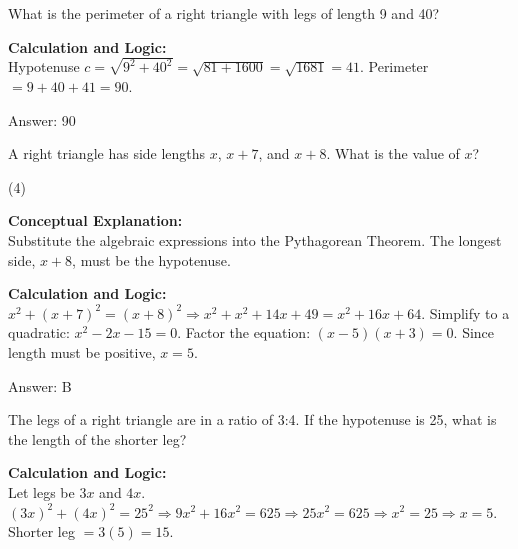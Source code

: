 \documentclass[11pt,paper=a4,answers]{exam}
\begin{document}
\begin{questions}
\vspace{60pt}

\question
What is the perimeter of a right triangle with legs of length 9 and 40?

\begin{solution}
\textbf{Calculation and Logic:} \\
Hypotenuse $c = \sqrt{9^2 + 40^2} = \sqrt{81 + 1600} = \sqrt{1681} = 41$. Perimeter $= 9 + 40 + 41 = 90$.

\vspace{30pt}

Answer: \colorbox{yellow!100}{90}
\end{solution}

\vspace{60pt}

\question
A right triangle has side lengths $x$, $x+7$, and $x+8$. What is the value of $x$?
\begin{tasks}(4)
\end{tasks}

\begin{solution}
\textbf{Conceptual Explanation:} \\
Substitute the algebraic expressions into the Pythagorean Theorem. The longest side, $x+8$, must be the hypotenuse.

\vspace{30pt}

\textbf{Calculation and Logic:} \\
$x^2 + (x+7)^2 = (x+8)^2 \Rightarrow x^2 + x^2 + 14x + 49 = x^2 + 16x + 64$. Simplify to a quadratic: $x^2 - 2x - 15 = 0$. Factor the equation: $(x-5)(x+3) = 0$. Since length must be positive, $x = 5$.

\vspace{30pt}

Answer: \colorbox{yellow!100}{B}
\end{solution}

\vspace{60pt}

\question
The legs of a right triangle are in a ratio of 3:4. If the hypotenuse is 25, what is the length of the shorter leg?

\begin{solution}
\textbf{Calculation and Logic:} \\
Let legs be $3x$ and $4x$. $(3x)^2 + (4x)^2 = 25^2 \Rightarrow 9x^2 + 16x^2 = 625 \Rightarrow 25x^2 = 625 \Rightarrow x^2 = 25 \Rightarrow x = 5$. Shorter leg $= 3(5) = 15$.


\end{solution}
\end{questions}
\end{document}
